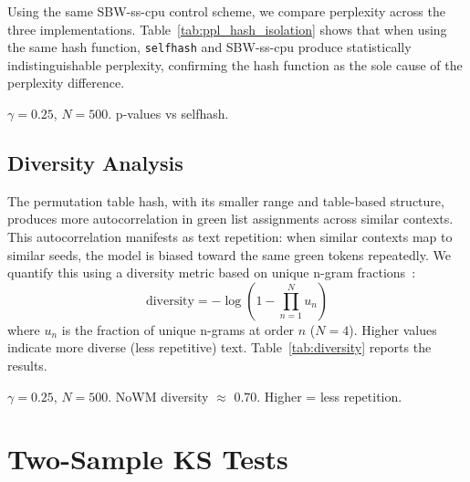 \documentclass[11pt]{article}
\begin{document}
Using the same SBW-ss-cpu control scheme, we compare perplexity across the three implementations. Table~\ref{tab:ppl_hash_isolation} shows that when using the same hash function, \texttt{selfhash} and SBW-ss-cpu produce statistically indistinguishable perplexity, confirming the hash function as the sole cause of the perplexity difference.

\begin{table}[!t]
\caption{Perplexity Comparison Isolating Hash Effect}
\label{tab:ppl_hash_isolation}
\begin{center}
\footnotesize
\resizebox{\columnwidth}{!}{}
\end{center}
\vspace{-2mm}
{\small $\gamma=0.25$, $N=500$. p-values vs selfhash.}
\end{table}

\subsection{Diversity Analysis}

The permutation table hash, with its smaller range and table-based structure, produces more autocorrelation in green list assignments across similar contexts. This autocorrelation manifests as text repetition: when similar contexts map to similar seeds, the model is biased toward the same green tokens repeatedly. We quantify this using a diversity metric based on unique n-gram fractions~\cite{welleck2020neural,li2023contrastive,kirchenbauer2024reliability}:
\begin{equation}
\text{diversity} = -\log\left(1 - \prod_{n=1}^{N} u_n\right)
\end{equation}
where $u_n$ is the fraction of unique n-grams at order $n$ ($N=4$). Higher values indicate more diverse (less repetitive) text. Table~\ref{tab:diversity} reports the results.

\begin{table}[!t]
\caption{Text Diversity Comparison (Watermarked)}
\label{tab:diversity}
\begin{center}
\footnotesize

\end{center}
\vspace{-2mm}
{\small $\gamma=0.25$, $N=500$. NoWM diversity $\approx$ 0.70. Higher = less repetition.}
\end{table}

\section{Two-Sample KS Tests}
\label{app:ks}
\end{document}
